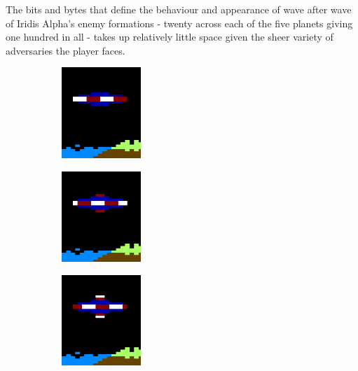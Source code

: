 The bits and bytes that define the behaviour and appearance of
wave after wave of Iridis Alpha's enemy formations - twenty across each of the
five planets giving one hundred in all - takes up relatively little space given
the sheer variety of adversaries the player faces.


\begin{figure}[H]
  {
    \setlength{\tabcolsep}{3.0pt}
    \setlength\cmidrulewidth{\heavyrulewidth} %
	\centering
	\begin{subfigure}{0.3\textwidth}
    \includegraphics[width=3cm]{src/sprites/gallery/sprite_160.png}%
	\centering
	\end{subfigure}
	\begin{subfigure}{0.3\textwidth}
    \includegraphics[width=3cm]{src/sprites/gallery/sprite_161.png}%
	\end{subfigure}
	\centering
	\begin{subfigure}{0.3\textwidth}
    \includegraphics[width=3cm]{src/sprites/gallery/sprite_162.png}%
	\end{subfigure}
  }

  {
  \setlength{\tabcolsep}{3.0pt}
  \setlength\cmidrulewidth{\heavyrulewidth} %
  \begin{adjustbox}{width=13cm}


\end{adjustbox}}
\end{figure}
